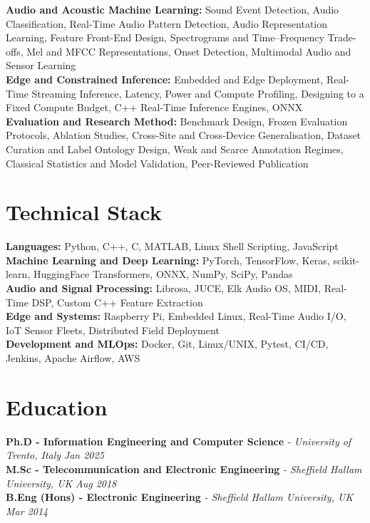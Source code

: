 \documentclass[11pt]{article}
\begin{document}
\textbf{Audio and Acoustic Machine Learning:} Sound Event Detection, Audio Classification, Real-Time Audio Pattern Detection, Audio Representation Learning, Feature Front-End Design, Spectrograms and Time--Frequency Trade-offs, Mel and MFCC Representations, Onset Detection, Multimodal Audio and Sensor Learning\\
\textbf{Edge and Constrained Inference:} Embedded and Edge Deployment, Real-Time Streaming Inference, Latency, Power and Compute Profiling, Designing to a Fixed Compute Budget, C++ Real-Time Inference Engines, ONNX\\
\textbf{Evaluation and Research Method:} Benchmark Design, Frozen Evaluation Protocols, Ablation Studies, Cross-Site and Cross-Device Generalisation, Dataset Curation and Label Ontology Design, Weak and Scarce Annotation Regimes, Classical Statistics and Model Validation, Peer-Reviewed Publication

\section*{Technical Stack}

\textbf{Languages:} Python, C++, C, MATLAB, Linux Shell Scripting, JavaScript\\
\textbf{Machine Learning and Deep Learning:} PyTorch, TensorFlow, Keras, scikit-learn, HuggingFace Transformers, ONNX, NumPy, SciPy, Pandas\\
\textbf{Audio and Signal Processing:} Librosa, JUCE, Elk Audio OS, MIDI, Real-Time DSP, Custom C++ Feature Extraction\\
\textbf{Edge and Systems:} Raspberry Pi, Embedded Linux, Real-Time Audio I/O, IoT Sensor Fleets, Distributed Field Deployment\\
\textbf{Development and MLOps:} Docker, Git, Linux/UNIX, Pytest, CI/CD, Jenkins, Apache Airflow, AWS

\section*{Education}
\textbf{Ph.D - Information Engineering and Computer Science} \textit{\small{ - University of Trento, Italy}} \hfill \textit{Jan 2025}\\[2pt]
\noindent\textbf{M.Sc - Telecommunication and Electronic Engineering} \textit{\small{ - Sheffield Hallam University, UK}} \hfill \textit{Aug 2018}\\[2pt]
\noindent\textbf{B.Eng (Hons) - Electronic Engineering} \textit{\small{ - Sheffield Hallam University, UK}} \hfill \textit{Mar 2014}
\end{document}
